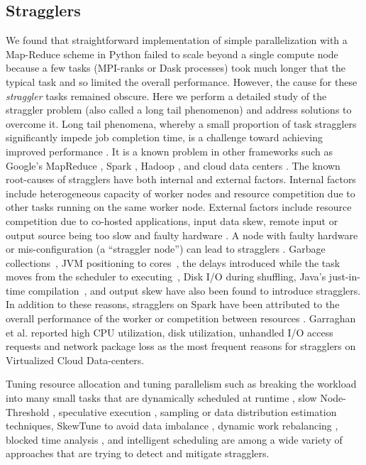 \subsection{Stragglers}
\label{sec:stragglers}

We found that straightforward implementation of simple parallelization with a Map-Reduce scheme in Python failed to scale beyond a single compute node \cite{Khoshlessan:2017ab} because a few tasks (MPI-ranks or Dask processes) took much longer that the typical task and so limited the overall performance.
However, the cause for these \emph{straggler} tasks remained obscure.
Here we perform a detailed study of the straggler problem (also called a long tail phenomenon) and address solutions to overcome it.
Long tail phenomena, whereby a small proportion of task stragglers significantly impede job completion time, is a challenge toward achieving improved performance \cite{Garraghan2016}.
It is a known problem in other frameworks such as Google's MapReduce \cite{Dean2004}, Spark \cite{Kyong2017,Ousterhout2017,Gittens2016}, Hadoop \cite{Dean2004}, and cloud data centers \cite{Schmidt2016}. The known root-causes of stragglers have both internal and external factors. 
Internal factors include heterogeneous capacity of worker nodes and resource competition due to other tasks running on the same worker node. 
External factors include resource competition due to co-hosted applications, input data skew, remote input or output source being too slow and faulty hardware \cite{Chen2014}.
A node with faulty hardware or mis-configuration (a ``straggler node'') can lead to stragglers \cite{Dean2004}. 
Garbage collections~\cite{Kyong2017,Ousterhout2017}, JVM positioning to cores~\cite{Kyong2017}, the delays introduced while the task moves from the scheduler to executing~\cite{Gittens2016}, Disk I/O during shuffling, Java's just-in-time compilation~\cite{Ousterhout2017}, and output skew \cite{Ousterhout2017} have also been found to introduce stragglers.
In addition to these reasons, stragglers on Spark have been attributed to the overall performance of the worker or competition between resources \cite{Yang2016}.
Garraghan et al. \cite{Garraghan2016} reported high CPU utilization, disk utilization, unhandled I/O access requests and network package loss as the most frequent reasons for stragglers on Virtualized Cloud Data-centers.

Tuning resource allocation and tuning parallelism such as breaking the workload into many small tasks that are dynamically scheduled at runtime \cite{Rosen2012}, slow Node-Threshold \cite{Dean2004}, speculative execution \cite{Dean2004}, sampling or data distribution estimation techniques, SkewTune to avoid data imbalance \cite{Kwon2012}, dynamic work rebalancing \cite{Schmidt2016}, blocked time analysis \cite{Ousterhout2015}, and intelligent scheduling \cite{AWE-WQ2014} are among a wide variety of approaches that are trying to detect and mitigate stragglers. 

